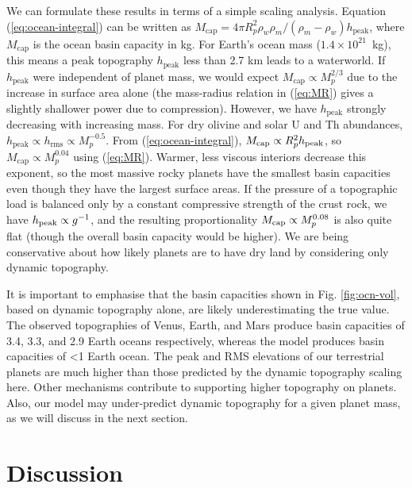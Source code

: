 We can formulate these results in terms of a simple scaling analysis. Equation (\ref{eq:ocean-integral}) can be written as $M_\text{cap} = 4 \pi R_p^2 \rho_w  \rho_m / (\rho_m - \rho_w) h_{\text{peak}}$, where $M_\text{cap}$ is the ocean basin capacity in kg. For Earth's ocean mass ($1.4 \times 10^{21}$~kg), this means a peak topography $h_{\text{peak}}$ less than 2.7 km leads to a waterworld. If $h_{\text{peak}}$ were independent of planet mass, we would expect $M_\text{cap} \propto M_p^{2/3}$ due to the increase in surface area alone (the mass-radius relation in (\ref{eq:MR}) gives a slightly shallower power due to compression). However, we have $h_{\text{peak}}$ strongly decreasing with increasing mass. For dry olivine and solar U and Th abundances, $h_{\text{peak}} \propto h_{\text{rms}} \propto M_p^{-0.5}$. From (\ref{eq:ocean-integral}), $M_\text{cap} \propto R_p^2 h_{\rm peak}$, so $M_\text{cap} \propto M_p^{0.04}$ using (\ref{eq:MR}). Warmer, less viscous interiors decrease this exponent, so the most massive rocky planets have the smallest basin capacities even though they have the largest surface areas. If the pressure of a topographic load is balanced only by a constant compressive strength of the crust rock, we have $h_{\rm peak} \propto g^{-1}$, and the resulting proportionality $M_{\rm cap} \propto M_p^{0.08}$ is also quite flat (though the overall basin capacity would be higher). We are being conservative about how likely planets are to have dry land by considering only dynamic topography.

It is important to emphasise that the basin capacities shown in Fig. \ref{fig:ocn-vol}, based on dynamic topography alone, are likely underestimating the true value. The observed topographies of Venus, Earth, and Mars produce basin capacities of 3.4, 3.3, and 2.9 Earth oceans respectively, whereas the model produces basin capacities of \textless1 Earth ocean. The peak and RMS elevations of our terrestrial planets are much higher than those predicted by the dynamic topography scaling here. Other mechanisms contribute to supporting higher topography on planets. Also, our model may under-predict dynamic topography for a given planet mass, as we will discuss in the next section.






\section{Discussion}
\label{sec:discussion-top}


